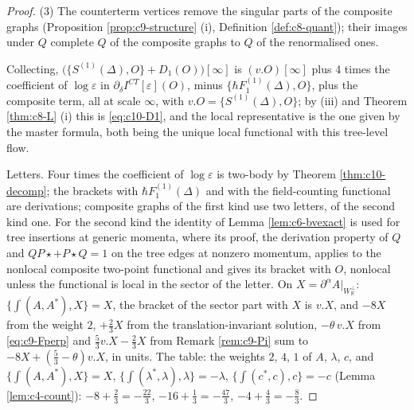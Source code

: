 \begin{proof}
(3) The counterterm vertices remove the singular parts of the composite graphs (Proposition \ref{prop:c9-structure} (i), Definition \ref{def:c8-quant}); their images under $Q$ complete $Q$ of the composite graphs to $Q$ of the renormalised ones.

Collecting, $\big(\{S^{(1)}(\Delta),O\}+D_1(O)\big)[\infty]$ is $(v.O)[\infty]$ plus $4$ times the coefficient of $\log\varepsilon$ in $\partial_\delta I^{CT}[\varepsilon](O)$, minus $\{\hbar F_1^{(1)}(\Delta),O\}$, plus the composite term, all at scale $\infty$, with $v.O=\{S^{(1)}(\Delta),O\}$; by (iii) and Theorem \ref{thm:c8-L} (i) this is \eqref{eq:c10-D1}, and the local representative is the one given by the master formula, both being the unique local functional with this tree-level flow.

Letters. Four times the coefficient of $\log\varepsilon$ is two-body by Theorem \ref{thm:c10-decomp}; the brackets with $\hbar F_1^{(1)}(\Delta)$ and with the field-counting functional are derivations; composite graphs of the first kind use two letters, of the second kind one. For the second kind the identity of Lemma \ref{lem:c6-bvexact} is used for tree insertions at generic momenta, where its proof, the derivation property of $Q$ and $QP\star+P\star Q=1$ on the tree edges at nonzero momentum, applies to the nonlocal composite two-point functional and gives its bracket with $O$, nonlocal unless the functional is local in the sector of the letter. On $X=\partial^\alpha A|_{W_{\mathbb R}^\perp}$: $\{\int(A,A^*),X\}=X$, the bracket of the sector part with $X$ is $v.X$, and $-8X$ from the weight $2$, $+\tfrac23X$ from the translation-invariant solution, $-\theta\,v.X$ from \eqref{eq:c9-Fperp} and $\tfrac53v.X-\tfrac23X$ from Remark \ref{rem:c9-Pi} sum to $-8X+(\tfrac53-\theta)v.X$, in units. The table: the weights $2$, $4$, $1$ of $A$, $\lambda$, $c$, and $\{\int(A,A^*),X\}=X$, $\{\int(\lambda^*,\lambda),\lambda\}=-\lambda$, $\{\int(c^*,c),c\}=-c$ (Lemma \ref{lem:c4-count}): $-8+\tfrac23=-\tfrac{22}3$, $-16+\tfrac13=-\tfrac{47}3$, $-4+\tfrac43=-\tfrac83$.
\end{proof}
